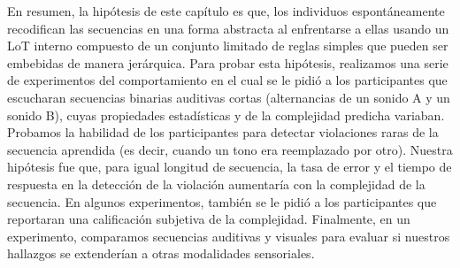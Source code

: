 En resumen, la hipótesis de este capítulo es que, los individuos espontáneamente recodifican las secuencias en una forma abstracta al enfrentarse a ellas usando un LoT interno compuesto de un conjunto limitado de reglas simples que pueden ser embebidas de manera jerárquica. Para probar esta hipótesis, realizamos una serie de experimentos del comportamiento en el cual se le pidió a los participantes que escucharan secuencias binarias auditivas cortas (alternancias de un sonido A y un sonido B), cuyas propiedades estadísticas y de la complejidad predicha variaban. Probamos la habilidad de los participantes para detectar violaciones raras de la secuencia aprendida (es decir, cuando un tono era reemplazado por otro). Nuestra hipótesis fue que, para igual longitud de secuencia, la tasa de error y el tiempo de respuesta en la detección de la violación aumentaría con la complejidad de la secuencia. En algunos experimentos, también se le pidió a los participantes que reportaran una calificación subjetiva de la complejidad. Finalmente, en un experimento, comparamos secuencias auditivas y visuales para evaluar si nuestros hallazgos se extenderían a otras modalidades sensoriales.


